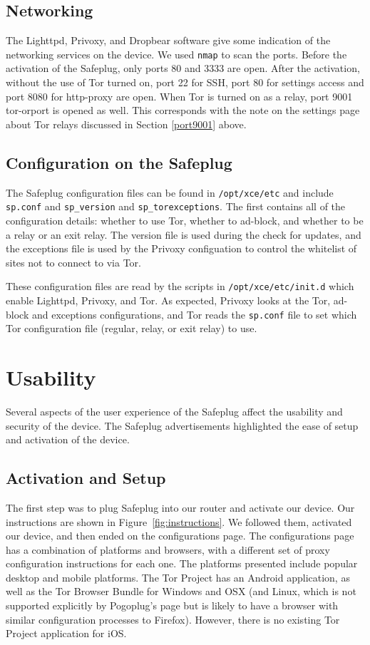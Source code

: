 \documentclass[conference]{IEEEtran}
\begin{document}
\subsection{Networking}
The Lighttpd, Privoxy, and Dropbear software give some indication of the networking services on the device.  We used \texttt{nmap} to scan the ports.  Before the activation of the Safeplug, only ports 80 and 3333 are open.  After the activation, without the use of Tor turned on, port 22 for SSH, port 80 for settings access and port 8080 for http-proxy are open.  When Tor is turned on as a relay, port 9001 tor-orport is opened as well.  This corresponds with the note on the settings page about Tor relays discussed in Section \ref{port9001} above.
    
\subsection{Configuration on the Safeplug}
\label{spconfig}
The Safeplug configuration files can be found in \verb!/opt/xce/etc! and include \verb!sp.conf! and \verb!sp_version! and \verb!sp_torexceptions!.  The first contains all of the configuration details: whether to use Tor, whether to ad-block, and whether to be a relay or an exit relay. The version file is used during the check for updates, and the exceptions file is used by the Privoxy configuation to control the whitelist of sites not to connect to via Tor.

These configuration files are read by the scripts in \verb!/opt/xce/etc/init.d! which enable Lighttpd, Privoxy, and Tor.  As expected, Privoxy looks at the Tor, ad-block and exceptions configurations, and Tor reads the \verb!sp.conf! file to set which Tor configuration file (regular, relay, or exit relay) to use.

\section{Usability}
Several aspects of the user experience of the Safeplug affect the usability and security of the device.  The Safeplug advertisements highlighted the ease of setup and activation of the device.

\subsection{Activation and Setup}
The first step was to plug Safeplug into our router and activate our device.  Our instructions are shown in Figure~\ref{fig:instructions}.  We followed them, activated our device, and then ended on the configurations page.  The configurations page has a combination of platforms and browsers, with a different set of proxy configuration instructions for each one.  The platforms presented include popular desktop and mobile platforms.  The Tor Project has an Android application, as well as the Tor Browser Bundle for Windows and OSX (and Linux, which is not supported explicitly by Pogoplug's page but is likely to have a browser with similar configuration processes to Firefox).  However, there is no existing Tor Project application for iOS.
\end{document}
